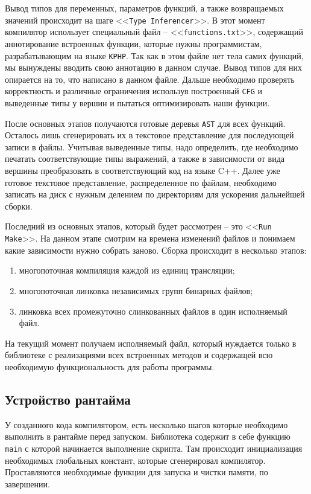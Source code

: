 Вывод типов для переменных, параметров функций, а также возвращаемых значений происходит на шаге <<\verb|Type Inferencer|>>.
В этот момент компилятор использует специальный файл -- <<\verb|functions.txt|>>, содержащий аннотирование встроенных функции, которые нужны программистам, разрабатывающим на языке \verb|KPHP|.
Так как в этом файле нет тела самих функций, мы вынуждены вводить свою аннотацию в данном случае.
Вывод типов для них опирается на то, что написано в данном файле.
Дальше необходимо проверять корректность и различные ограничения используя построенный \verb|CFG| и выведенные типы у вершин и пытаться оптимизировать наши функции.

После основных этапов получаются готовые деревья \verb|AST| для всех функций.
Осталось лишь сгенерировать их в текстовое представление для последующей записи в файлы.
Учитывая выведенные типы, надо определить, где необходимо печатать соответствующие типы выражений, а также в зависимости от вида вершины преобразовать в соответствующий код на языке C++.
Далее уже готовое текстовое представление, распределенное по файлам, необходимо записать на диск с нужным делением по директориям для ускорения дальнейшей сборки.

Последний из основных этапов, который будет рассмотрен -- это <<\verb|Run Make|>>.
На данном этапе смотрим на времена изменений файлов и понимаем какие зависимости нужно собрать заново.
Сборка происходит в несколько этапов:
\begin{enumerate}
  \item многопоточная компиляция каждой из единиц трансляции;
  \item многопоточная линковка независимых групп бинарных файлов;
  \item линковка всех промежуточно слинкованных файлов в один исполняемый файл.
\end{enumerate}

На текущий момент получаем исполняемый файл, который нуждается только в библиотеке с реализациями всех встроенных методов и содержащей всю необходимую функциональность для работы программы.

\subsection{Устройство рантайма}
\label{sec2:runtime_principle}
У созданного кода компилятором, есть несколько шагов которые необходимо выполнить в рантайме перед запуском.
Библиотека содержит в себе функцию \verb|main| с которой начинается выполнение скрипта.
Там происходит инициализация необходимых глобальных констант, которые сгенерировал компилятор.
Проставляются необходимые функции для запуска и чистки памяти, по завершении.

